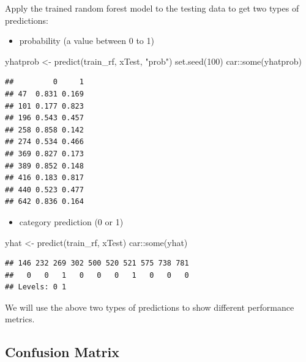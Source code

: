 \documentclass[
  12pt,
]{krantz}
\makeatletter
\newenvironment{Shaded}{\begin{snugshade}}{\end{snugshade}}
\newcommand{\DecValTok}[1]{\textcolor[rgb]{0.06,0.06,0.06}{#1}}
\newcommand{\FunctionTok}[1]{\textcolor[rgb]{0,0,0}{#1}}
\newcommand{\NormalTok}[1]{#1}
\newcommand{\OtherTok}[1]{\textcolor[rgb]{0.37,0.37,0.37}{#1}}
\newcommand{\SpecialCharTok}[1]{\textcolor[rgb]{0,0,0}{#1}}
\newcommand{\StringTok}[1]{\textcolor[rgb]{0.5,0.5,0.5}{#1}}
\providecommand{\tightlist}{%
  \setlength{\itemsep}{0pt}\setlength{\parskip}{0pt}}
\newenvironment{kframe}{%
\medskip{}
\setlength{\fboxsep}{.8em}
 \def\at@end@of@kframe{}%
 \ifinner\ifhmode%
  \def\at@end@of@kframe{\end{minipage}}%
  \begin{minipage}{\columnwidth}%
 \fi\fi%
 \def\FrameCommand##1{\hskip\@totalleftmargin \hskip-\fboxsep
 \colorbox{shadecolor}{##1}\hskip-\fboxsep
     \hskip-\linewidth \hskip-\@totalleftmargin \hskip\columnwidth}%
 \MakeFramed {\advance\hsize-\width
   \@totalleftmargin\z@ \linewidth\hsize
   \@setminipage}}%
 {\par\unskip\endMakeFramed%
 \at@end@of@kframe}
\renewenvironment{Shaded}{\begin{kframe}}{\end{kframe}}
\makeatother
\begin{document}
Apply the trained random forest model to the testing data to get two types of predictions:

\begin{itemize}
\tightlist
\item
  probability (a value between 0 to 1)
\end{itemize}

\begin{Shaded}
\begin{Highlighting}[]
\NormalTok{yhatprob }\OtherTok{\textless{}{-}} \FunctionTok{predict}\NormalTok{(train\_rf, xTest, }\StringTok{"prob"}\NormalTok{)}
\FunctionTok{set.seed}\NormalTok{(}\DecValTok{100}\NormalTok{)}
\NormalTok{car}\SpecialCharTok{::}\FunctionTok{some}\NormalTok{(yhatprob)}
\end{Highlighting}
\end{Shaded}

\begin{verbatim}
##         0     1
## 47  0.831 0.169
## 101 0.177 0.823
## 196 0.543 0.457
## 258 0.858 0.142
## 274 0.534 0.466
## 369 0.827 0.173
## 389 0.852 0.148
## 416 0.183 0.817
## 440 0.523 0.477
## 642 0.836 0.164
\end{verbatim}

\begin{itemize}
\tightlist
\item
  category prediction (0 or 1)
\end{itemize}

\begin{Shaded}
\begin{Highlighting}[]
\NormalTok{yhat }\OtherTok{\textless{}{-}} \FunctionTok{predict}\NormalTok{(train\_rf, xTest)}
\NormalTok{car}\SpecialCharTok{::}\FunctionTok{some}\NormalTok{(yhat)}
\end{Highlighting}
\end{Shaded}

\begin{verbatim}
## 146 232 269 302 500 520 521 575 738 781 
##   0   0   1   0   0   0   1   0   0   0 
## Levels: 0 1
\end{verbatim}

We will use the above two types of predictions to show different performance metrics.

\hypertarget{confusion-matrix}{%
\subsection{Confusion Matrix}\label{confusion-matrix}}
\end{document}
